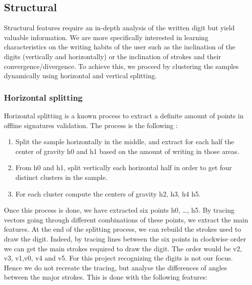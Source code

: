 \documentclass[a4paper]{article}
\begin{document}
{\subsection{Structural}

Structural features require an in-depth analysis of the written digit but yield valuable information. We are more specifically interested in learning characteristics on the writing habits of the user such as the inclination of the digits (vertically and horizontally) or the inclination of strokes and their convergence/divergence. To achieve this, we proceed by clustering the samples dynamically using horizontal and vertical splitting.

\subsubsection{Horizontal splitting}

Horizontal splitting is a known process to extract a definite amount of points in offline signatures validation. The process is the following : 

\vspace{2mm}
\begin{enumerate}
	\item Split the sample horizontally in the middle, and extract for each half the center of gravity h0 and h1 based on the amount of writing in those areas.
	\item From h0 and h1, split vertically each horizontal half in order to get four distinct clusters in the sample.
	\item For each cluster compute the centers of gravity h2, h3, h4 h5.
\end{enumerate}
\vspace{2mm}

Once this process is done, we have extracted six points h0, …, h5. By tracing vectors going through different combinations of these points, we extract the main features. At the end of the splitting process, we can rebuild the strokes used to draw the digit. Indeed, by tracing lines between the six points in clockwise order we can get the main strokes required to draw the digit. The order would be v2, v3, v1,v0, v4 and v5. For this project recognizing the digits is not our focus. Hence we do not recreate the tracing, but analyse the differences of angles between the major strokes. This is done with the following features:

}
\end{document}
